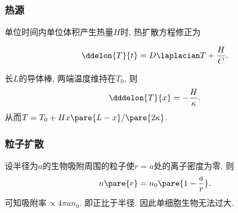 \documentclass[../Thermal.tex]{subfiles}
\begin{document}
\subsubsection{热源}
单位时间内单位体积产生热量$H$时, 热扩散方程修正为
\begin{finale}
\[ \ddelon{T}{t} = D\laplacian T + \frac{H}{C}. \]
\end{finale}
\begin{ex}
长$L$的导体棒, 两端温度维持在$T_0$, 则
\[ \dddelon{T}{x} = -\frac{H}{\kappa}. \]
从而$T = T_0 + Hx\pare{L-x}/\pare{2\kappa}$.
\end{ex}
\subsubsection{粒子扩散}
\begin{ex}
设半径为$a$的生物吸附周围的粒子使$r=a$处的离子密度为零, 则
\[ n\pare{r} = n_0\pare{1-\frac{a}{r}}. \]
可知吸附率$\propto 4\pi a n_0$. 即正比于半径. 因此单细胞生物无法过大.
\end{ex}
\end{document}
